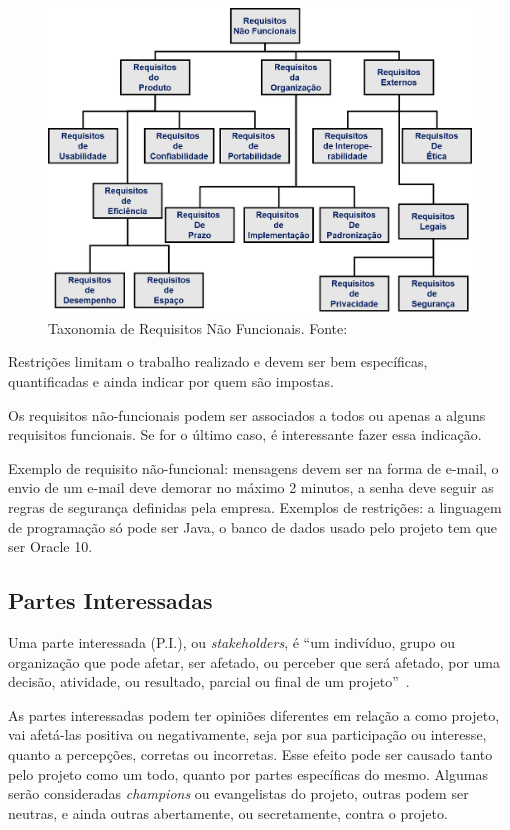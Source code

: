 \documentclass[a4]{report}
\newcommand{\othersize}{0.7\linewidth}
\begin{document}
\begin{figure}
    \centering
    \includegraphics[width=\othersize]{imagens/NonFunReq.png}
    \caption{Taxonomia de Requisitos Não Funcionais. Fonte: \citet{sommerville:software:2015}}
    \label{fig:nofunreq}
\end{figure}

Restrições limitam o trabalho realizado e devem ser bem específicas, quantificadas e ainda indicar por quem são impostas.

Os requisitos não-funcionais podem ser associados a todos ou apenas a alguns requisitos funcionais. Se for o último caso, é interessante fazer essa indicação.

Exemplo de requisito não-funcional: mensagens devem ser na forma de e-mail, o envio de um e-mail deve demorar no máximo 2 minutos, a senha deve seguir as regras de segurança definidas pela empresa. Exemplos de restrições: a linguagem de programação só pode ser Java, o banco de dados usado pelo projeto tem que ser Oracle 10. 



\subsection{Partes Interessadas}

Uma parte interessada (P.I.), ou \textit{stakeholders}, é ``um indivíduo, grupo ou organização que pode afetar, ser afetado, ou perceber que será afetado, por uma decisão, atividade, ou resultado, parcial ou final de um projeto''~\citep{pmbok:6}.

As partes interessadas  podem ter opiniões diferentes em relação a como projeto,  vai afetá-las positiva ou negativamente, seja por sua participação ou interesse, quanto a percepções, corretas ou incorretas. Esse efeito pode ser causado tanto pelo projeto como um todo, quanto por partes específicas do mesmo. Algumas serão consideradas \textit{champions} ou evangelistas do projeto, outras podem ser neutras, e ainda outras abertamente, ou secretamente, contra o projeto.
\end{document}
